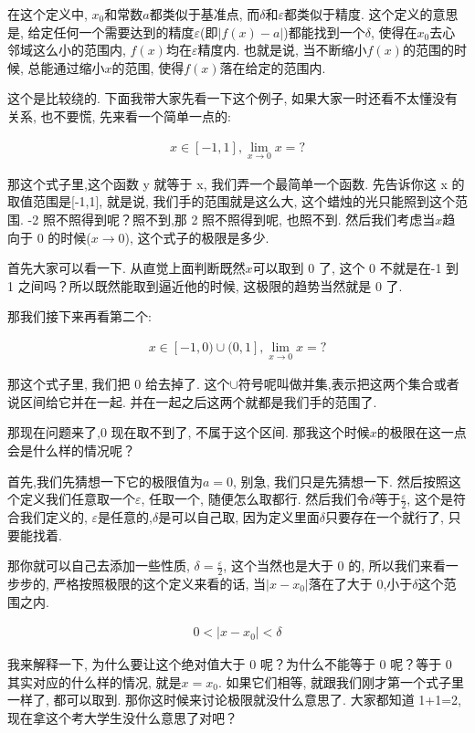 在这个定义中, $x_0$和常数$a$都类似于基准点, 而$\delta$和$\varepsilon$都类似于精度. 这个定义的意思是, 给定任何一个需要达到的精度$\varepsilon$(即$|f(x)-a|$)都能找到一个$\delta$, 使得在$x_0$去心邻域这么小的范围内, $f(x)$均在$\varepsilon$精度内. 也就是说, 当不断缩小$f(x)$的范围的时候, 总能通过缩小$x$的范围, 使得$f(x)$落在给定的范围内. 

这个是比较绕的. 下面我带大家先看一下这个例子, 如果大家一时还看不太懂没有关系, 也不要慌, 先来看一个简单一点的: 

\begin{align*}
  x\in [-1, 1], \lim_{x \to 0} x = ?
\end{align*}

那这个式子里,这个函数 y 就等于 x, 我们弄一个最简单一个函数. 先告诉你这 x 的取值范围是[-1,1], 就是说, 我们手的范围就是这么大, 这个蜡烛的光只能照到这个范围. -2 照不照得到呢？照不到,那 2 照不照得到呢, 也照不到. 然后我们考虑当$x$趋向于 0 的时候($x\to0$), 这个式子的极限是多少.

首先大家可以看一下. 从直觉上面判断既然$x$可以取到 0 了, 这个 0 不就是在-1 到 1 之间吗？所以既然能取到逼近他的时候, 这极限的趋势当然就是 0 了. 

那我们接下来再看第二个: 

\begin{align*}
  x \in [-1,0) \cup (0, 1], \lim_{x \to 0} x = ?
\end{align*}

那这个式子里, 我们把 0 给去掉了. 这个$\cup$符号呢叫做并集,表示把这两个集合或者说区间给它并在一起. 并在一起之后这两个就都是我们手的范围了. 

那现在问题来了,0 现在取不到了, 不属于这个区间. 那我这个时候$x$的极限在这一点会是什么样的情况呢？

首先,我们先猜想一下它的极限值为$a=0$, 别急, 我们只是先猜想一下. 然后按照这个定义我们任意取一个$\varepsilon$, 任取一个, 随便怎么取都行. 然后我们令$\delta$等于$\frac{\varepsilon}{2}$, 这个是符合我们定义的, $\varepsilon$是任意的,$\delta$是可以自己取, 因为定义里面$\delta$只要存在一个就行了, 只要能找着. 

那你就可以自己去添加一些性质, $\delta = \frac{\varepsilon}{2}$, 这个当然也是大于 0 的, 所以我们来看一步步的, 严格按照极限的这个定义来看的话, 当$|x-x_0|$落在了大于 0,小于$\delta$这个范围之内. 

\begin{align*}
  0 < |x-x_0| < \delta
\end{align*}

我来解释一下, 为什么要让这个绝对值大于 0 呢？为什么不能等于 0 呢？等于 0 其实对应的什么样的情况, 就是$x=x_0$. 如果它们相等, 就跟我们刚才第一个式子里一样了, 都可以取到. 那你这时候来讨论极限就没什么意思了. 大家都知道 1+1=2,现在拿这个考大学生没什么意思了对吧？

